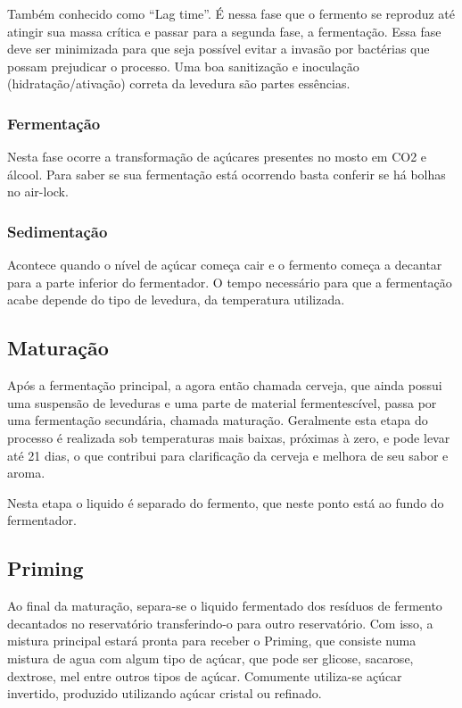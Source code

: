 Também conhecido como “Lag time”. É nessa fase que o fermento se reproduz até atingir sua massa crítica e passar para a segunda fase, a fermentação. Essa fase deve ser minimizada para que seja possível evitar a invasão por bactérias que possam prejudicar o processo. Uma boa sanitização e inoculação (hidratação/ativação) correta da levedura são partes essências.

\subsubsection{Fermentação}
Nesta fase ocorre a transformação de açúcares presentes no mosto em CO2 e álcool. Para saber se sua fermentação está ocorrendo basta conferir se há bolhas no air-lock.

\subsubsection{Sedimentação}

Acontece quando o nível de açúcar começa cair e o fermento começa a decantar para a parte inferior do fermentador. O tempo necessário para que a fermentação acabe depende do tipo de levedura, da temperatura utilizada.

\subsection{Maturação}

Após a fermentação principal, a agora então chamada cerveja, que ainda possui uma suspensão de leveduras e uma parte de material fermentescível, passa por uma fermentação secundária, chamada maturação. Geralmente esta etapa do processo é realizada sob temperaturas mais baixas, próximas à zero, e pode levar até 21 dias, o que contribui para clarificação da cerveja e melhora de seu sabor e aroma.

Nesta etapa o liquido é separado do fermento, que neste ponto está ao fundo do fermentador.

\subsection{Priming}
Ao final da maturação, separa-se o liquido fermentado dos resíduos de fermento decantados no reservatório transferindo-o para outro reservatório. Com isso, a mistura principal estará pronta para receber o Priming, que consiste numa mistura de agua com algum tipo de açúcar, que pode ser glicose, sacarose, dextrose, mel entre outros tipos de açúcar. Comumente utiliza-se açúcar invertido, produzido utilizando açúcar cristal ou refinado.

